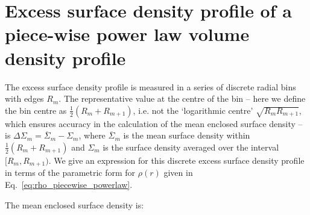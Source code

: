 \documentclass[usenatbib]{mnras}
\begin{document}

\appendix
\onecolumn
\section{Excess surface density profile of a piece-wise power law volume density profile}
\label{sec:appendix_invert_esd}

\noindent The excess surface density profile is measured in a series of discrete radial bins with edges $R_m$. The representative value at the centre of the bin -- here we define the bin centre as $\frac{1}{2}(R_m+R_{m+1})$, i.e. not the `logarithmic centre' $\sqrt{R_mR_{m+1}}$, which ensures accuracy in the calculation of the mean enclosed surface density -- is $\Delta\Sigma_m=\overline{\Sigma}_m-\Sigma_m$, where $\overline{\Sigma}_m$ is the mean surface density within $\frac{1}{2}(R_m+R_{m+1})$ and $\Sigma_m$ is the surface density averaged over the interval $[R_m,R_{m+1})$. We give an expression for this discrete excess surface density profile in terms of the parametric form for $\rho(r)$ given in Eq.~\ref{eq:rho_piecewise_powerlaw}.

The mean enclosed surface density is:
\end{document}
